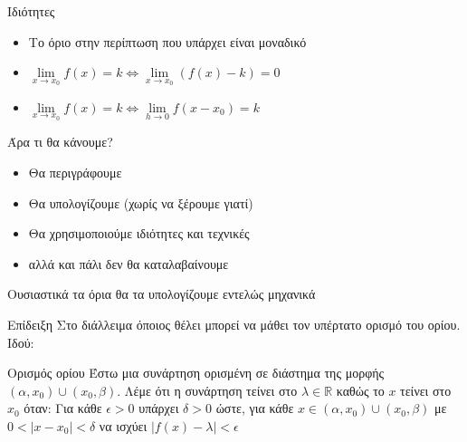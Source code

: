 \documentclass[greek]{beamer}
\begin{document}
\begin{frame}{Ιδιότητες}
 \begin{itemize}
  \item Το όριο στην περίπτωση που υπάρχει είναι μοναδικό \pause
  \item $\lim\limits_{x \to x_0}{ f(x) }=k\iff\lim\limits_{x \to x_0}{ \left( f(x)-k \right) }=0$ \pause
  \item $\lim\limits_{x \to x_0}{ f(x) }=k\iff\lim\limits_{h \to 0}{ f(x-x_0) }=k$
 \end{itemize}
\end{frame}
\begin{frame}{Άρα τι θα κάνουμε?}
 \begin{itemize}
  \item Θα περιγράφουμε \pause
  \item Θα υπολογίζουμε (χωρίς να ξέρουμε γιατί) \pause
  \item Θα χρησιμοποιούμε ιδιότητες και τεχνικές \pause
  \item αλλά και πάλι δεν θα καταλαβαίνουμε
 \end{itemize}
 Ουσιαστικά τα όρια θα τα υπολογίζουμε εντελώς μηχανικά
\end{frame}

\begin{frame}{Επίδειξη}
 Στο διάλλειμα όποιος θέλει μπορεί να μάθει τον υπέρτατο ορισμό του ορίου\pause. Ιδού:
 \begin{block}{Ορισμός ορίου}
  Έστω μια συνάρτηση ορισμένη σε διάστημα της μορφής $(α,x_0)\cup (x_0,β)$. Λέμε ότι η συνάρτηση τείνει στο $λ\in\mathbb{R}$ καθώς το $x$ τείνει στο $x_0$ όταν: \pause
  \newline
  \newline
  Για κάθε $\epsilon>0$ υπάρχει $δ>0$ ώστε, για κάθε $x\in (α,x_0)\cup (x_0,β)$ με $0<|x-x_0|<δ$ να ισχύει $|f(x)-λ|<\epsilon$
 \end{block}

\end{frame}
\end{document}
